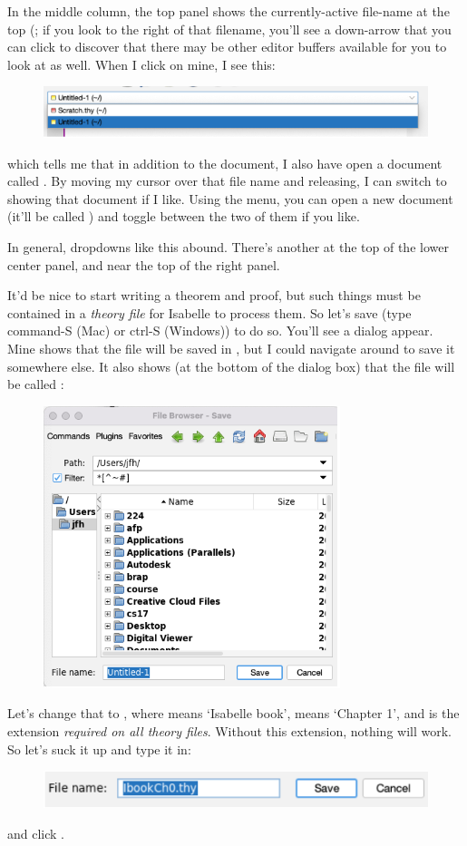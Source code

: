 In the middle column, the top panel shows the currently-active file-name at the top (; if you look to the right of that filename, you'll see a down-arrow that you can click to discover that there may be other editor buffers available for you to look at as well. When I click on mine, I see this:
\begin{figure}
    \centering
    \includegraphics[width=1\linewidth]{C01//Images/file-list.png}
\end{figure}
which tells me that in addition to the  document, I also have open a document called . By moving my cursor over that file name and releasing, I can switch to showing that document if I like. Using the  menu, you can open a new document (it'll be called ) and toggle between the two of them if you like.

In general, dropdowns like this abound. There's another at the top of the lower center panel, and near the top of the right panel. 

It'd be nice to start writing a theorem and proof, but such things must be contained in a \textit{theory file} for Isabelle to process them. So let's save  (type command-S (Mac) or ctrl-S (Windows)) to do so. You'll see a dialog appear. Mine shows that the file will be saved in , but I could navigate around to save it somewhere else. It also shows (at the bottom of the dialog box) that the file will be called :
\begin{figure}[h]
    \centering
    \includegraphics[width=0.5\linewidth]{C01//Images/file-chooser.png}
\end{figure}
Let's change that to , where  means `Isabelle book',  means `Chapter 1', and  is the extension \textit{required on all theory files}. Without this extension, nothing will work. So let's suck it up and type it in:
\begin{figure}[h]
    \centering
    \includegraphics[width=0.75\linewidth]{C01//Images/file-name-edit.png}
\end{figure}
and click . 

